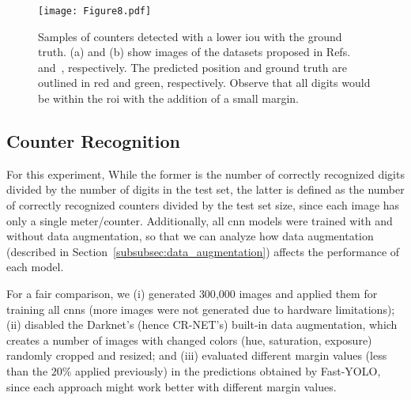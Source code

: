 

\begin{figure}
    \begin{center}
	\texttt{[image: Figure8.pdf]}
	\end{center}	
	\vspace{-3mm} 
    \caption{Samples of counters detected with a lower \gls*{iou} with the ground truth. (a) and (b) show images of the datasets proposed in Refs.~ and~, respectively. The predicted position and ground truth are outlined in red and green, respectively. Observe that all digits would be within the \gls*{roi} with the addition of a small margin.}
    \label{fig:detection_public_lower_iou}
\end{figure}

\subsection{Counter Recognition}
\label{subsec:results_recognition}

For this experiment,  While the former is the number of correctly recognized digits divided by the number of digits in the test set, the latter is defined as the number of correctly recognized counters divided by the test set size, since each image has only a single meter/counter. 
Additionally, all \gls*{cnn} models were trained with and without data augmentation, so that we can analyze how data augmentation (described in Section~\ref{subsubsec:data_augmentation}) affects the performance of each model.

For a fair comparison, we (i) generated $300$,$000$ images and applied them for training all \glspl*{cnn} (more images were not generated due to hardware limitations); (ii) disabled the Darknet’s (hence CR-NET’s) built-in data augmentation, which creates a number of images with changed colors (hue, saturation, exposure) randomly cropped and resized; and (iii) evaluated different margin values (less than the $20$\% applied previously) in the predictions obtained by Fast-YOLO, since each approach might work better with different margin values.

